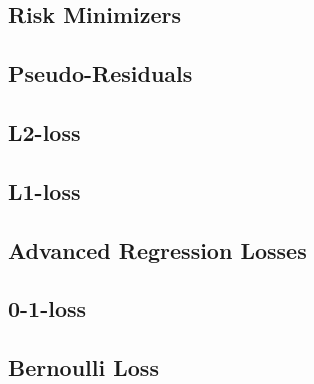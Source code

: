 

\subsection{Risk Minimizers}


\subsection{Pseudo-Residuals}


\subsection{L2-loss}


\subsection{L1-loss}


\subsection{Advanced Regression Losses}


\subsection{0-1-loss}


\subsection{Bernoulli Loss}


